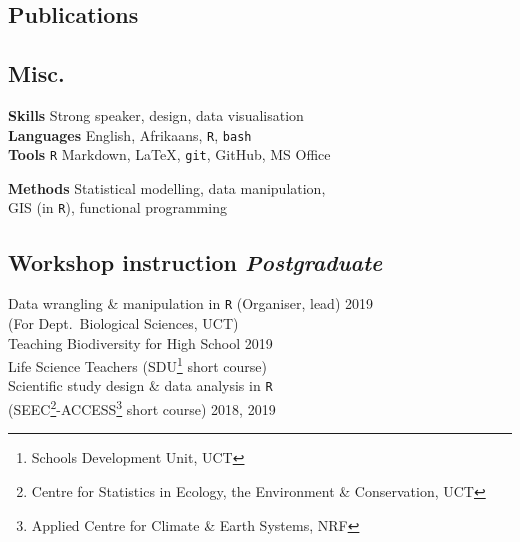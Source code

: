 \documentclass[10pt]{article}
\begin{document}


\bigskip



\subsection*{Publications} %



\hrulefill

\begin{multicols}{2} %

\subsection*{Misc.} %

\textbf{Skills   }     \hfill      Strong speaker, design, data visualisation \\
\textbf{Languages}     \hfill   English, Afrikaans, \texttt{R}, \texttt{bash} \\
\textbf{Tools    }     \hfill \texttt{R} Markdown, { \selectfont
                              \LaTeX}, \texttt{git}, GitHub, MS Office

\textbf{Methods  }     \hfill       Statistical modelling, data manipulation, \\
                       \hfill     GIS (in \texttt{R}), functional programming

\subsection*{Workshop instruction %
                                 \hfill {\small \textmd{\textit{Postgraduate}}}}

Data wrangling \& manipulation in \texttt{R}
  {\small (Organiser, lead)}                       \hfill {\small       2019} \\
  \hspace{2em} {\small (For Dept.~Biological Sciences, UCT)}                  \\
Teaching Biodiversity for High School              \hfill {\small       2019} \\
  \hspace{2em} Life Science Teachers {\small (SDU\footnote{
    Schools Development Unit, UCT} short course)}                             \\
Scientific study design \& data analysis in \texttt{R}                        \\
  \hspace{2em} {\small(SEEC\footnote{Centre for Statistics in
  Ecology, the Environment \&
  Conservation, UCT}-ACCESS\footnote{Applied
  Centre for Climate \& Earth Systems, NRF}
  short course)}                                   \hfill {\small 2018, 2019}


\end{multicols}
\end{document}
